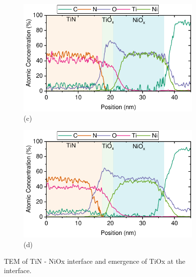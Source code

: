 \begin{figure}[htbp]
    \begin{subfigure}[t]{0.49\textwidth}
        \centering
        \includegraphics[width=\textwidth]{chapters/material_properties/images/TEM_30_min.pdf} %
        \caption*{(c)}
    \end{subfigure}
    \hfill
    \begin{subfigure}[t]{0.49\textwidth}
        \centering
        \includegraphics[width=\textwidth]{chapters/material_properties/images/TEM_60_min.pdf} %
        \caption*{(d)}
    \end{subfigure}
    \caption{TEM of TiN - NiOx interface and emergence of TiOx at the interface.}
    \label{fig:ch2:tem_pix_substrate}
\end{figure}



\cleardoublepage

